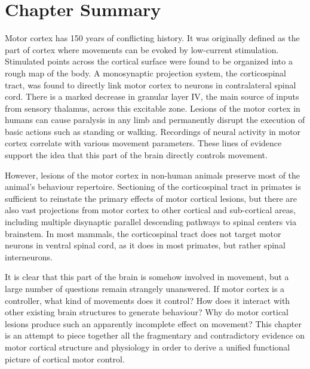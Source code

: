 				
\section{Chapter Summary}

Motor cortex has 150 years of conflicting history. It was originally defined as the part of cortex where movements can be evoked by low-current stimulation. Stimulated points across the cortical surface were found to be organized into a rough map of the body. A monosynaptic projection system, the corticospinal tract, was found to directly link motor cortex to neurons in contralateral spinal cord. There is a marked decrease in granular layer IV, the main source of inputs from sensory thalamus, across this excitable zone. Lesions of the motor cortex in humans can cause paralysis in any limb and permanently disrupt the execution of basic actions such as standing or walking. Recordings of neural activity in motor cortex correlate with various movement parameters. These lines of evidence support the idea that this part of the brain directly controls movement.

However, lesions of the motor cortex in non-human animals preserve most of the animal's behaviour repertoire. Sectioning of the corticospinal tract in primates is sufficient to reinstate the primary effects of motor cortical lesions, but there are also vast projections from motor cortex to other cortical and sub-cortical areas, including multiple disynaptic parallel descending pathways to spinal centers via brainstem. In most mammals, the corticospinal tract does not target motor neurons in ventral spinal cord, as it does in most primates, but rather spinal interneurons.

It is clear that this part of the brain is somehow involved in movement, but a large number of questions remain strangely unanswered. If motor cortex is a controller, what kind of movements does it control? How does it interact with other existing brain structures to generate behaviour? Why do motor cortical lesions produce such an apparently incomplete effect on movement? This chapter is an attempt to piece together all the fragmentary and contradictory evidence on motor cortical structure and physiology in order to derive a unified functional picture of cortical motor control.

\pagebreak


